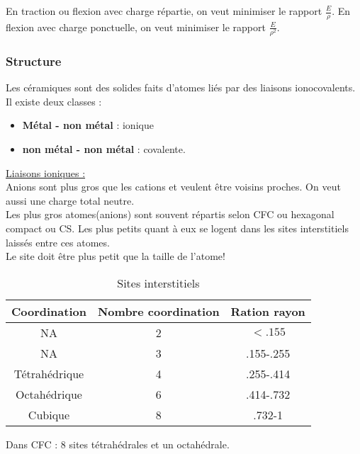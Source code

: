 \documentclass[../main.tex]{subfiles}
\begin{document}
En traction ou flexion avec charge répartie, on veut minimiser le rapport $\frac{E}{\rho}$. En flexion avec charge ponctuelle, on veut minimiser le rapport $\frac{E}{\rho^2}$.

\subsubsection{Structure}
Les céramiques sont des solides faits d'atomes liés par des liaisons ionocovalents. \\
Il existe deux classes :\\
\begin{itemize}
    \item \textbf{Métal - non métal} : ionique\\
    \item \textbf{non métal - non métal} : covalente.\\
\end{itemize}

\quad \underline{Liaisons ioniques :}\\
Anions sont plus gros que les cations et veulent être voisins proches. On veut aussi une charge total neutre.\\

Les plus gros atomes(anions) sont souvent répartis selon CFC ou hexagonal compact ou CS. Les plus petits quant à eux se logent dans les sites interstitiels laissés entre ces atomes. \\
\warning Le site doit être plus petit que la taille de l'atome!\\

\begin{table}[hbt!]
    \centering
    \begin{tabular}{||c|c|c|}
    \hline
        Coordination & Nombre coordination & Ration rayon \\
        \hline
        NA & 2 & $<.155$\\
        NA & 3 & .155-.255\\
        Tétrahédrique & 4 & .255-.414\\
        Octahédrique & 6 & .414-.732\\
        Cubique & 8 & .732-1\\
        \hline
    \end{tabular}
    \caption{Sites interstitiels}
    
\end{table}

Dans CFC : 8 sites tétrahédrales et un octahédrale.\\
\end{document}
